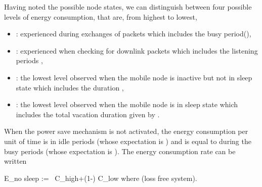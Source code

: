 \documentclass[journal]{IEEEtran}
\newcommand {\beq} {}
\begin{document}
Having noted the possible node states, we can distinguish between four possible levels of energy consumption, that are, from highest to lowest,
\begin{itemize}
\item : experienced during exchanges of packets which includes the busy period(),
\item : experienced when checking for downlink packets which includes the listening periods ,
\item : the lowest level observed when the mobile
node is inactive but not in sleep state which includes the duration ,
\item : the lowest level observed when the mobile
node is in sleep state which includes the total vacation duration given by .
\end{itemize}
When the power save mechanism is not activated, the energy consumption per unit of time is  in idle periods (whose expectation is ) and is equal to  during the busy periods (whose expectation is ). The energy consumption rate can be written
\beq
\label{e:Enosleep}
E_{\textrm{no sleep}} := \rho\, C_{\textrm{high}}+(1-\rho) C_{\textrm{low}}
\eeq
where  (loss free system).
\end{document}
